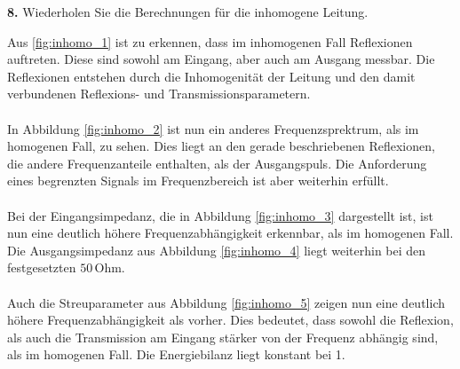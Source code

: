 \documentclass[Protokollheft.tex]{subfiles}
\begin{document}
\begin{framed}
	\noindent \textbf{8.} Wiederholen Sie die Berechnungen für die inhomogene Leitung.\label{exer:calc4inhomTLine}
\end{framed}
\noindent
Aus \ref{fig:inhomo_1} ist zu erkennen, dass im inhomogenen Fall Reflexionen auftreten. Diese sind sowohl am Eingang, aber auch am Ausgang messbar. Die Reflexionen entstehen durch die Inhomogenität der Leitung und den damit verbundenen Reflexions- und Transmissionsparametern.\\
\\
In Abbildung \ref{fig:inhomo_2} ist nun ein anderes Frequenzsprektrum, als im homogenen Fall, zu sehen. Dies liegt an den gerade beschriebenen Reflexionen, die andere Frequenzanteile enthalten, als der Ausgangspuls. Die Anforderung eines begrenzten Signals im Frequenzbereich ist aber weiterhin erfüllt.\\
\\
Bei der Eingangsimpedanz, die in Abbildung \ref{fig:inhomo_3} dargestellt ist, ist nun eine deutlich höhere Frequenzabhängigkeit erkennbar, als im homogenen Fall. Die Ausgangsimpedanz aus Abbildung \ref{fig:inhomo_4} liegt weiterhin bei den festgesetzten $50\,$Ohm.\\
\\
Auch die Streuparameter aus Abbildung \ref{fig:inhomo_5} zeigen nun eine deutlich höhere Frequenzabhängigkeit als vorher. Dies bedeutet, dass sowohl die Reflexion, als auch die Transmission am Eingang stärker von der Frequenz abhängig sind, als im homogenen Fall. Die Energiebilanz liegt konstant bei 1.
\end{document}
